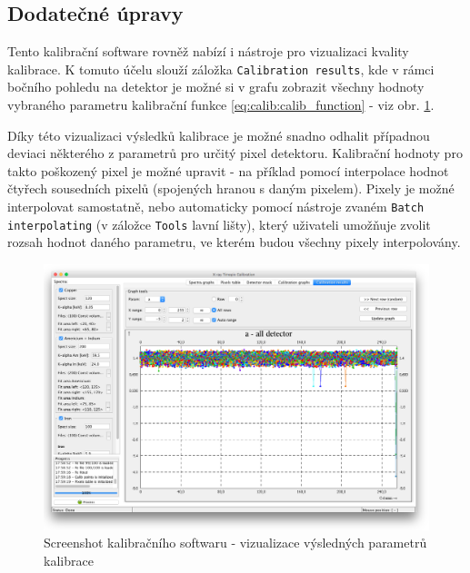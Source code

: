 \subsection{Dodatečné úpravy}\label{calib:sw:post_process}
Tento kalibrační software rovněž nabízí i nástroje pro vizualizaci kvality kalibrace. K tomuto účelu slouží záložka \texttt{Calibration results}, kde v rámci bočního pohledu na detektor je možné si v grafu zobrazit všechny hodnoty vybraného parametru kalibrační funkce \ref{eq:calib:calib_function} - viz obr. \ref{fig:calib:sw_calib_results}.

Díky této vizualizaci výsledků kalibrace je možné snadno odhalit případnou deviaci některého z parametrů pro určitý pixel detektoru. Kalibrační hodnoty pro takto poškozený pixel je možné upravit - na příklad pomocí interpolace hodnot čtyřech sousedních pixelů (spojených hranou s daným pixelem). Pixely je možné interpolovat samostatně, nebo automaticky pomocí nástroje zvaném \texttt{Batch interpolating} (v záložce \texttt{Tools} lavní lišty), který uživateli umožňuje zvolit rozsah hodnot daného parametru, ve kterém budou všechny pixely interpolovány.

\begin{figure}[t]
	\begin{center}
		\includegraphics[width=16cm]{figures/calibsw_result.png}
		\caption{Screenshot kalibračního softwaru - vizualizace výsledných parametrů kalibrace}
		\label{fig:calib:sw_calib_results}
	\end{center}
\end{figure}










